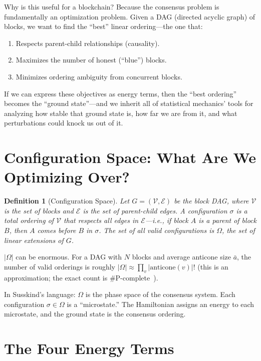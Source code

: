 \documentclass[11pt,a4paper]{article}
\newtheorem{definition}[theorem]{Definition}
\begin{document}
Why is this useful for a blockchain? Because the consensus problem is fundamentally an optimization problem. Given a DAG (directed acyclic graph) of blocks, we want to find the ``best'' linear ordering---the one that:

\begin{enumerate}
    \item Respects parent-child relationships (causality).
    \item Maximizes the number of honest (``blue'') blocks.
    \item Minimizes ordering ambiguity from concurrent blocks.
\end{enumerate}

If we can express these objectives as energy terms, then the ``best ordering'' becomes the ``ground state''---and we inherit all of statistical mechanics' tools for analyzing how stable that ground state is, how far we are from it, and what perturbations could knock us out of it.

\section{Configuration Space: What Are We Optimizing Over?}

\begin{definition}[Configuration Space]
Let $G = (\mathcal{V}, \mathcal{E})$ be the block DAG, where $\mathcal{V}$ is the set of blocks and $\mathcal{E}$ is the set of parent-child edges. A \emph{configuration} $\sigma$ is a total ordering of $\mathcal{V}$ that respects all edges in $\mathcal{E}$---i.e., if block $A$ is a parent of block $B$, then $A$ comes before $B$ in $\sigma$. The set of all valid configurations is $\Omega$, the set of \emph{linear extensions} of $G$.
\end{definition}

$|\Omega|$ can be enormous. For a DAG with $N$ blocks and average anticone size $\bar{a}$, the number of valid orderings is roughly $|\Omega| \approx \prod_{v} |\text{anticone}(v)|!$ (this is an approximation; the exact count is \#P-complete~\cite{brightwell}).

In Susskind's language: $\Omega$ is the phase space of the consensus system. Each configuration $\sigma \in \Omega$ is a ``microstate.'' The Hamiltonian assigns an energy to each microstate, and the ground state is the consensus ordering.

\section{The Four Energy Terms}
\end{document}
